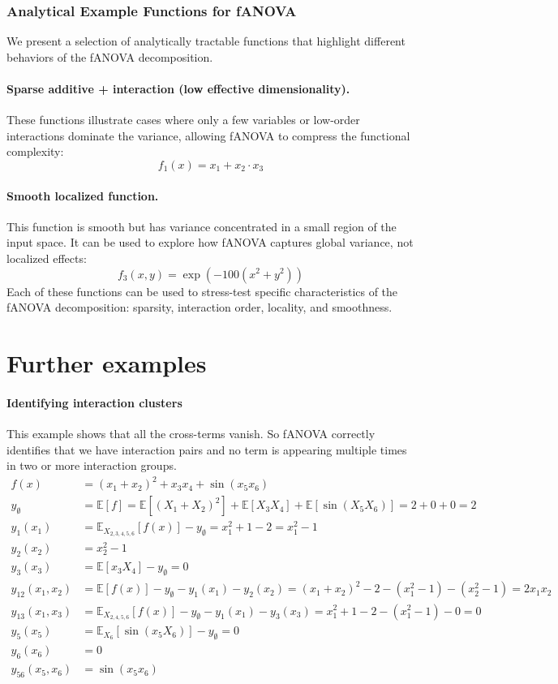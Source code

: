 
\subsubsection*{Analytical Example Functions for fANOVA}

We present a selection of analytically tractable functions that highlight different behaviors of the fANOVA decomposition.

\paragraph{Sparse additive + interaction (low effective dimensionality).}
These functions illustrate cases where only a few variables or low-order interactions dominate the variance, allowing fANOVA to compress the functional complexity:
\[
f_1(x) = x_1 + x_2 \cdot x_3
\]


\paragraph{Smooth localized function.}
This function is smooth but has variance concentrated in a small region of the input space. It can be used to explore how fANOVA captures global variance, not localized effects:
\[
f_3(x, y) = \exp\left(-100(x^2 + y^2)\right)
\]
Each of these functions can be used to stress-test specific characteristics of the fANOVA decomposition: sparsity, interaction order, locality, and smoothness.

\section{Further examples}


\paragraph{Identifying interaction clusters}
This example shows that all the cross-terms vanish. So fANOVA correctly identifies that we have interaction pairs and no term is appearing multiple times in two or more interaction groups.
\begin{align*}
f(x) &= (x_1 + x_2)^2 + x_3 x_4 + \sin(x_5 x_6) \\[1em]
y_\emptyset &= \mathbb{E}[f] = \mathbb{E}[(X_1 + X_2)^2] + \mathbb{E}[X_3 X_4] + \mathbb{E}[\sin(X_5 X_6)] = 2 + 0 + 0 = 2 \\[1em]
y_1(x_1) &= \mathbb{E}_{X_{2,3,4,5,6}}[f(x)] - y_\emptyset = x_1^2 + 1 - 2 = x_1^2 - 1 \\
y_2(x_2) &= x_2^2 - 1 \\
y_3(x_3) &= \mathbb{E}[x_3 X_4] - y_\emptyset = 0 \\
y_{12}(x_1, x_2) &= \mathbb{E}[f(x)] - y_\emptyset - y_1(x_1) - y_2(x_2) = (x_1 + x_2)^2 - 2 - (x_1^2 - 1) - (x_2^2 - 1) = 2x_1 x_2 \\
y_{13}(x_1, x_3) &= \mathbb{E}_{X_{2,4,5,6}}[f(x)] - y_\emptyset - y_1(x_1) - y_3(x_3) = x_1^2 + 1 - 2 - (x_1^2 - 1) - 0 = 0 \\
y_5(x_5) &= \mathbb{E}_{X_6}[\sin(x_5 X_6)] - y_\emptyset = 0 \\
y_6(x_6) &= 0 \\
y_{56}(x_5, x_6) &= \sin(x_5 x_6)
\end{align*}


